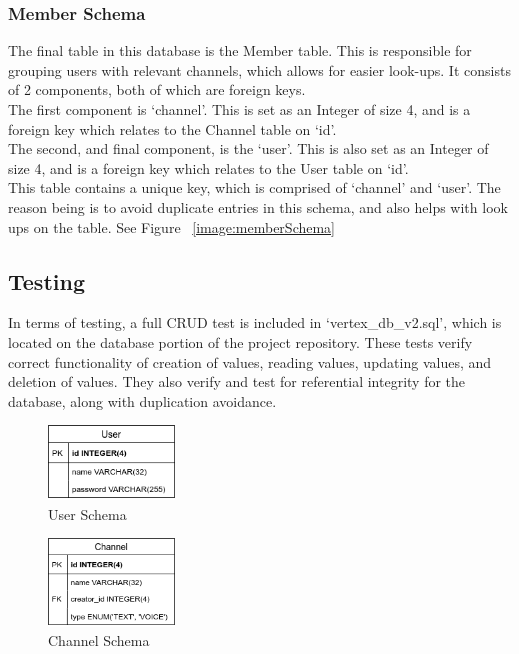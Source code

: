 \subsubsection{Member Schema}
The final table in this database is the Member table. This is responsible for grouping users with relevant channels, which allows for easier look-ups. It consists of 2 components, both of which are foreign keys.
\\ The first component is ‘channel’. This is set as an Integer of size 4, and is a  foreign key which relates to the Channel table on ‘id’.
\\ The second, and final component, is the ‘user’. This is also set as an Integer of size 4, and is a foreign key which relates to the User table on ‘id’.
\\ This table contains a unique key, which is comprised of  ‘channel’ and ‘user’. The reason being is to avoid duplicate entries in this schema, and also helps with look ups on the table.
See Figure ~\ref{image:memberSchema}

\subsection{Testing}
In terms of testing, a full CRUD test is included in ‘vertex\_db\_v2.sql’, which is located on the database portion of the project repository. These tests verify correct functionality of creation of values, reading values, updating values, and deletion of values. They also verify and test for referential integrity for the database, along with duplication avoidance.

\begin{figure}[h!]
    \caption{User Schema}
    \label{image:userSchema}
    \centering
    \includegraphics[width=0.3\textwidth]{images/UserSchema.png}
\end{figure}

\begin{figure}[h!]
    \caption{Channel Schema}
    \label{image:channelSchema}
    \centering
    \includegraphics[width=0.3\textwidth]{images/ChannelSchema.png}
\end{figure}

